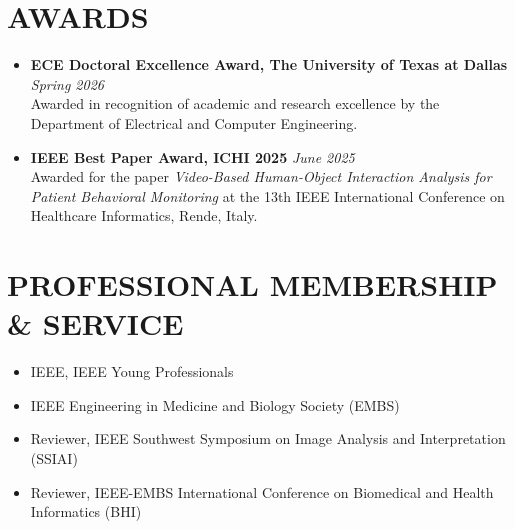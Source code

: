 \documentclass[10pt,a4paper,sans]{moderncv}
\begin{document}
\vspace*{-6mm}
\section{AWARDS}
\begin{itemize}[leftmargin=0.35cm, label={\textbullet}, itemsep=0.3em, parsep=0pt]
    
    
    \item \textbf{ECE Doctoral Excellence Award, The University of Texas at Dallas} \hfill \textit{Spring 2026}\\
    Awarded in recognition of academic and research excellence by the Department of Electrical and Computer Engineering.

    \item \textbf{IEEE Best Paper Award, ICHI 2025} \hfill \textit{June 2025}\\
    Awarded for the paper \textit{Video-Based Human-Object Interaction Analysis for Patient Behavioral Monitoring} at the 13th IEEE International Conference on Healthcare Informatics, Rende, Italy.
\end{itemize}

\vspace*{-6mm}
\section{PROFESSIONAL MEMBERSHIP \& SERVICE}

\begin{itemize}[leftmargin=0.35cm, label={\textbullet}, itemsep=0.3em, parsep=0pt]
    \item IEEE, IEEE Young Professionals
    \item IEEE Engineering in Medicine and Biology Society (EMBS)
    \item Reviewer, IEEE Southwest Symposium on Image Analysis and Interpretation (SSIAI)
    \item Reviewer, IEEE-EMBS International Conference on Biomedical and Health Informatics (BHI)
\end{itemize}

\vspace*{-6mm}
\end{document}
